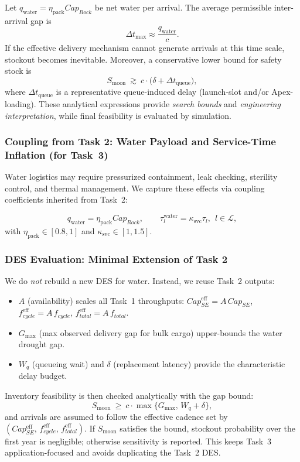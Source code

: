 ﻿\documentclass{mcmthesis}
\begin{document}
Let $q_{\text{water}}=\eta_{\text{pack}}Cap_{Rock}$ be net water per arrival.
The average permissible inter-arrival gap is
\begin{equation}
\Delta t_{\max}\approx \frac{q_{\text{water}}}{c}.
\end{equation}
If the effective delivery mechanism cannot generate arrivals at this time scale, stockout becomes inevitable.
Moreover, a conservative lower bound for safety stock is
\begin{equation}
S_{\text{moon}} \ \gtrsim\ c\cdot\Big(\delta+\Delta t_{\text{queue}}\Big),
\end{equation}
where $\Delta t_{\text{queue}}$ is a representative queue-induced delay (launch-slot and/or Apex-loading).
These analytical expressions provide \emph{search bounds} and \emph{engineering interpretation}, while final feasibility
is evaluated by simulation.

\subsubsection{Coupling from Task 2: Water Payload and Service-Time Inflation (for Task~3)}
\label{sec:model3_coupling_opt}

Water logistics may require pressurized containment, leak checking, sterility control, and thermal management.
We capture these effects via coupling coefficients inherited from Task~2:

\begin{equation}
q_{\text{water}}=\eta_{\text{pack}}Cap_{Rock},
\qquad
\tau_l^{\text{water}}=\kappa_{\text{svc}}\tau_l,\ \ l\in\mathcal{L},
\end{equation}
with $\eta_{\text{pack}}\in[0.8,1]$ and $\kappa_{\text{svc}}\in[1,1.5]$.

\subsubsection{DES Evaluation: Minimal Extension of Task 2}
\label{sec:model3_des_opt}
We do \emph{not} rebuild a new DES for water. Instead, we reuse Task~2 outputs:
\begin{itemize}
    \item $A$ (availability) scales all Task~1 throughputs: $Cap_{SE}^{\text{eff}}=A\,Cap_{SE}$, $f_{cycle}^{\text{eff}}=A\,f_{cycle}$, $f_{total}^{\text{eff}}=A\,f_{total}$.
    \item $G_{\max}$ (max observed delivery gap for bulk cargo) upper-bounds the water drought gap.
    \item $W_q$ (queueing wait) and $\delta$ (replacement latency) provide the characteristic delay budget.
\end{itemize}
Inventory feasibility is then checked analytically with the gap bound:
\[
S_{\text{moon}}\ \ge\ c\cdot \max\{G_{\max},\, W_q+\delta\},
\]
and arrivals are assumed to follow the effective cadence set by $(Cap_{SE}^{\text{eff}},\,f_{cycle}^{\text{eff}},\,f_{total}^{\text{eff}})$. If $S_{\text{moon}}$ satisfies the bound, stockout probability over the first year is negligible; otherwise sensitivity is reported. This keeps Task~3 application-focused and avoids duplicating the Task~2 DES.
\end{document}
